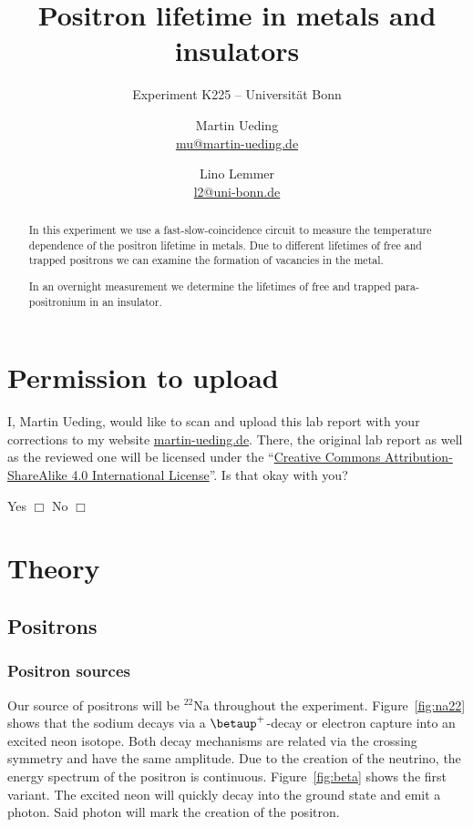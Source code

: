 \documentclass[11pt, english, fleqn, DIV=15, headinclude, BCOR=2cm]{scrreprt}
\title{Positron lifetime in metals and insulators}
\subtitle{Experiment K225 -- Universität Bonn}
\author{%
    Martin Ueding \\
    \small{\href{mailto:mu@martin-ueding.de}{mu@martin-ueding.de}}
    \and
    Lino Lemmer \\
    \small{\href{mailto:l2@uni-bonn.de}{l2@uni-bonn.de}}
}
\date{\daterange{2016-03-24}{2016-03-25}}
\begin{document}
\maketitle

\begin{abstract}
        In this experiment we use a fast-slow-coincidence circuit to measure
        the temperature dependence of the positron lifetime in metals. Due to
        different lifetimes of free and trapped positrons we can examine the
        formation of vacancies in the metal. 
        
        In an overnight measurement we determine the lifetimes of free and
        trapped para-positronium in an insulator. 
\end{abstract}

\tableofcontents

\chapter*{Permission to upload}

I, Martin Ueding, would like to scan and upload this lab report with your
corrections to my website \href{http://martin-ueding.de}{martin-ueding.de}.
There, the original lab report as well as the reviewed one will be licensed
under the “\href{http://creativecommons.org/licenses/by-sa/4.0/}{Creative
Commons Attribution-ShareAlike 4.0 International License}”. Is that okay with
you?

Yes $\Box$ \hspace{2cm} No $\Box$

\chapter{Theory}

\section{Positrons}

\subsection{Positron sources}

Our source of positrons will be $\mathrm{^{22}Na}$ throughout the experiment.
Figure~\ref{fig:na22} shows that the sodium decays via a $\betaup^+$-decay or
electron capture into an excited neon isotope. Both decay mechanisms are
related via the crossing symmetry and have the same amplitude. Due to the
creation of the neutrino, the energy spectrum of the positron is continuous.
Figure~\ref{fig:beta} shows the first variant. The excited neon will quickly
decay into the ground state and emit a photon. Said photon will mark the
creation of the positron.
\end{document}
